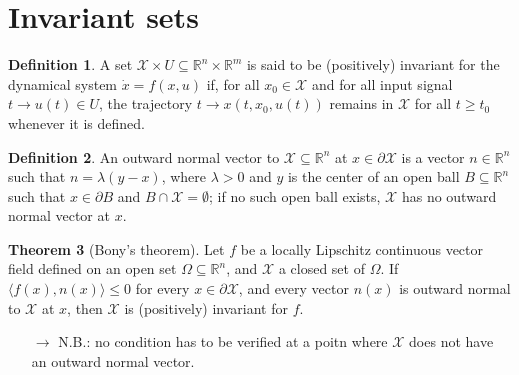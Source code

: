 \documentclass[12pt, openany]{report}
\theoremstyle{definition}
\newtheorem{thm}{Theorem}[chapter]
\newtheorem{definition}[thm]{Definition}
\newcommand{\R}{\mathbb{R}}
\begin{document}
\section{Invariant sets}
\begin{definition}
    A set \(\mathcal{X} \times U\subseteq \R^n\times \R^m\) is said to be (positively) invariant for the dynamical system \(\dot x=f(x,u)\) if, for all \(x_0\in \mathcal{X}\) and for all input signal \(t\rightarrow u(t)\in U\), the trajectory \(t\rightarrow x(t,x_0,u(t))\) remains in \(\mathcal{X}\) for all \(t\ge t_0\) whenever it is defined.
\end{definition}
\begin{definition}
    An outward normal vector to \(\mathcal{X}\subseteq \R^n\) at \(x\in \partial \mathcal{X}\) is a vector \(n\in \R^n\) such that \(n=\lambda(y-x)\), where \(\lambda >0\) and \(y\) is the center of an open ball \(B\subseteq \R^n\) such that \(x\in \partial B\) and \(B\cap \mathcal{X}=\emptyset\); if no such open ball exists, \(\mathcal{X}\) has no outward normal vector at \(x\). 
\end{definition}
\begin{thm}[Bony's theorem]
    Let \(f\) be a locally Lipschitz continuous vector field defined on an open set \(\Omega \subseteq \R^n\), and \(\mathcal{X}\) a closed set of \(\Omega\). If \(\langle f(x),n(x)\rangle \le 0\) for every \(x\in \partial \mathcal{X}\), and every vector \(n(x)\) is outward normal to \(\mathcal{X}\) at \(x\), then \(\mathcal{X}\) is (positively) invariant for \(f\).
\end{thm}
\begin{itemize}
    \item [\(\rightarrow\)] N.B.: no condition has to be verified at a poitn where \(\mathcal{X}\) does not have an outward normal vector.
\end{itemize}
\end{document}

